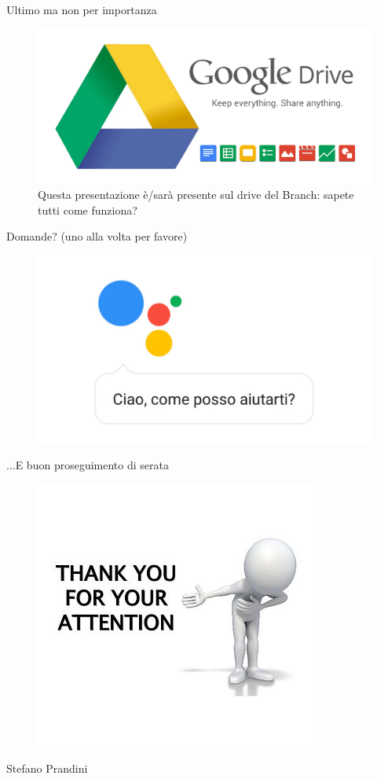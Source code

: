 \documentclass{beamer}
\begin{document}
\begin{frame}{Ultimo ma non per importanza}
\begin{figure}[h!]
\includegraphics[height=0.6\textheight]{immagini/drive.png}
\caption{Questa presentazione è/sarà presente sul drive del Branch: sapete tutti come funziona?}
\end{figure}
\end{frame}

\begin{frame}{Domande? (uno alla volta per favore)}
\begin{figure}[h!]
\includegraphics[height=0.6\textheight]{immagini/help.jpg}
\end{figure}
\end{frame}

\begin{frame}{...E buon proseguimento di serata}
\begin{figure}[h!]
\includegraphics[height=0.6\textheight]{immagini/grazie.png}
\end{figure}
\center Stefano Prandini\\ 
\end{frame}
\end{document}
